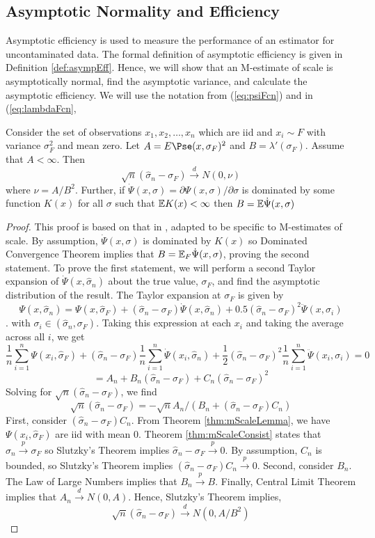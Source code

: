 \subsection{Asymptotic Normality and Efficiency}

Asymptotic efficiency is used to measure the performance of an estimator for uncontaminated data. The formal definition of asymptotic efficiency is given in Definition \ref{def:asympEff}. Hence, we will show that an M-estimate of scale is asymptotically normal, find the asymptotic variance, and calculate the asymptotic efficiency.  We will use the notation from (\ref{eq:psiFcn}) and in (\ref{eq:lambdaFcn},
\begin{thm}
\label{thm:mScaleAsympNormaliy}
Consider the set of observations $x_1, x_2,  \hdots, x_n$ which are iid and $x_i \sim F$ with variance $\sigma_F^2$ and mean zero. Let $A = E \Pse(x,\sigma_F)^2$ and $B = \lambda'(\sigma_F)$. Assume that $A < \infty$. Then
$$ \sqrt{n} (\hat\sigma_n - \sigma_F) \xrightarrow{d} N(0,\nu) $$
where $\nu = A/B^2$. Further, if $\Dot{\Psi}(x,\sigma) = \partial \Psi(x,\sigma)/\partial \sigma$ is dominated by some function $K(x)$ for all $\sigma$ such that $\mathbb{E} K(x) < \infty$ then $B = \mathbb{E} \Dot{\Psi}(x,\sigma)$
\end{thm}
\begin{proof}
This proof is based on that in \cite{maronna2019robust}, adapted to be specific to M-estimates of scale. By assumption, $\Dot{\Psi}(x,\sigma)$ is dominated by $K(x)$ so Dominated Convergence Theorem implies that $B = \mathbb{E}_F \Dot{\Psi}(x,\sigma)$, proving the second statement. To prove the first statement, we will perform a second Taylor expansion of $\Dot{\Psi}(x,\hat\sigma_n)$ about the true value, $\sigma_F$, and find the asymptotic distribution of the result. The Taylor expansion at $\sigma_F$ is given by
$$ \Psi(x,\hat\sigma_n) = \Psi(x,\hat\sigma_F) + (\hat\sigma_n - \sigma_F) \Dot{\Psi}(x,\hat\sigma_n) + 0.5 (\hat\sigma_n - \sigma_F)^2 \ddot{\Psi}(x,\sigma_i)$$.
with $\sigma_i \in (\hat\sigma_n, \sigma_F)$. Taking this expression at each $x_i$ and taking the average across all $i$, we get
$$\frac{1}{n} \sum_{i=1}^n \Psi(x_i,\hat\sigma_F) + (\hat\sigma_n - \sigma_F) \frac{1}{n} \sum_{i=1}^n \Dot{\Psi}(x_i,\hat\sigma_n) + \frac{1}{2} (\hat\sigma_n - \sigma_F)^2 \frac{1}{n} \sum_{i=1}^n \ddot{\Psi}(x_i,\sigma_i) = 0 $$
$$= A_n + B_n (\hat\sigma_n - \sigma_F) + C_n (\hat\sigma_n - \sigma_F)^2$$
Solving for $\sqrt{n} (\hat\sigma_n - \sigma_F)$, we find
$$ \sqrt{n} (\hat\sigma_n - \sigma_F) = -\sqrt{n}A_n/(B_n + (\hat\sigma_n - \sigma_F) C_n) $$
First, consider $(\hat\sigma_n - \sigma_F) C_n$. From Theorem \ref{thm:mScaleLemma}, we have $\Psi(x_i,\hat\sigma_F)$ are iid with mean 0. Theorem \ref{thm:mScaleConsist} states that $\hat\sigma_n \xrightarrow{p} \sigma_F$ so Slutzky's Theorem implies $\hat\sigma_n -\sigma_F \xrightarrow{p} 0$. By assumption, $C_n$ is bounded, so Slutzky's Theorem implies $(\hat\sigma_n - \sigma_F) C_n \xrightarrow{p} 0$. Second, consider $B_n$. The Law of Large Numbers implies that $B_n\xrightarrow{p} B$. Finally, Central Limit Theorem implies that $A_n \xrightarrow{d} N(0,A)$. Hence, Slutzky's Theorem implies,
$$ \sqrt{n} (\hat\sigma_n - \sigma_F) \xrightarrow{d} N( 0, A/B^2 ) $$
\end{proof}
